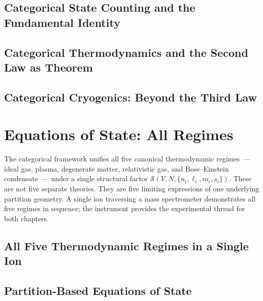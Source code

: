 \documentclass[12pt,a4paper,twoside,openright]{book}
\theoremstyle{plain}
\theoremstyle{definition}
\theoremstyle{remark}
\begin{document}
\chapter{Categorical State Counting and the Fundamental Identity}
\label{ch:counting}


\chapter{Categorical Thermodynamics and the Second Law as Theorem}
\label{ch:thermodynamics}


\chapter{Categorical Cryogenics: Beyond the Third Law}
\label{ch:cryogenics}


\part{Equations of State: All Regimes}
\label{part:eos}

\noindent
The categorical framework unifies all five canonical thermodynamic regimes~---
ideal gas, plasma, degenerate matter, relativistic gas, and Bose--Einstein
condensate~--- under a single structural factor $\mathcal{S}(V,N,\{n_i,\ell_i,m_i,s_i\})$.
These are not five separate theories.
They are five limiting expressions of one underlying partition geometry.
A single ion traversing a mass spectrometer demonstrates all five regimes
in sequence; the instrument provides the experimental thread for both chapters.

\chapter{All Five Thermodynamic Regimes in a Single Ion}
\label{ch:regimes}


\chapter{Partition-Based Equations of State}
\label{ch:eos}


\end{document}
